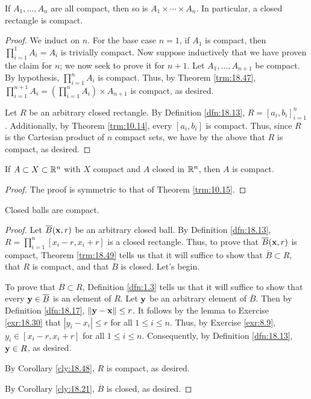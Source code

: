 \documentclass[../main.tex]{subfiles}
\begin{document}
\begin{corollary}\label{cly:18.48}
    If $A_1,\dots,A_n$ are all compact, then so is $A_1\times\cdots\times A_n$. In particular, a closed rectangle is compact.
    \begin{proof}
        We induct on $n$. For the base case $n=1$, if $A_1$ is compact, then $\prod_{i=1}^1A_i=A_i$ is trivially compact. Now suppose inductively that we have proven the claim for $n$; we now seek to prove it for $n+1$. Let $A_1,\dots,A_{n+1}$ be compact. By hypothesis, $\prod_{i=1}^nA_i$ is compact. Thus, by Theorem \ref{trm:18.47}, $\prod_{i=1}^{n+1}A_i=(\prod_{i=1}^nA_i)\times A_{n+1}$ is compact, as desired.\par
        Let $R$ be an arbitrary closed rectangle. By Definition \ref{dfn:18.13}, $R=[a_i,b_i]_{i=1}^n$. Additionally, by Theorem \ref{trm:10.14}, every $[a_i,b_i]$ is compact. Thus, since $R$ is the Cartesian product of $n$ compact sets, we have by the above that $R$ is compact, as desired.
    \end{proof}
\end{corollary}

\begin{theorem}\label{trm:18.49}
    If $A\subset X\subset\mathbb{R}^n$ with $X$ compact and $A$ closed in $\mathbb{R}^n$, then $A$ is compact.
    \begin{proof}
        The proof is symmetric to that of Theorem \ref{trm:10.15}.
    \end{proof}
\end{theorem}

\begin{theorem}\label{trm:18.50}
    Closed balls are compact.
    \begin{proof}
        Let $\overline{B}(\mathbf{x},r)$ be an arbitrary closed ball. By Definition \ref{dfn:18.13}, $R=\prod_{i=1}^n[x_i-r,x_i+r]$ is a closed rectangle. Thus, to prove that $\overline{B}(\mathbf{x},r)$ is compact, Theorem \ref{trm:18.49} tells us that it will suffice to show that $\overline{B}\subset R$, that $R$ is compact, and that $\overline{B}$ is closed. Let's begin.\par\smallskip
        To prove that $\overline{B}\subset R$, Definition \ref{dfn:1.3} tells us that it will suffice to show that every $\mathbf{y}\in\overline{B}$ is an element of $R$. Let $\mathbf{y}$ be an arbitrary element of $\overline{B}$. Then by Definition \ref{dfn:18.17}, $\norm{\mathbf{y}-\mathbf{x}}\leq r$. It follows by the lemma to Exercise \ref{exr:18.30} that $|y_i-x_i|\leq r$ for all $1\leq i\leq n$. Thus, by Exercise \ref{exr:8.9}, $y_i\in[x_i-r,x_i+r]$ for all $1\leq i\leq n$. Consequently, by Definition \ref{dfn:18.13}, $\mathbf{y}\in R$, as desired.\par
        By Corollary \ref{cly:18.48}, $R$ is compact, as desired.\par
        By Corollary \ref{cly:18.21}, $\overline{B}$ is closed, as desired.
    \end{proof}
\end{theorem}
\end{document}
